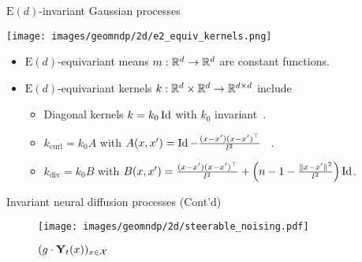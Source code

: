

\begin{frame}{$\mathrm{E}(d)$-invariant Gaussian processes}
    
    \begin{center}
        \texttt{[image: images/geomndp/2d/e2\_equiv\_kernels.png]}
    \end{center}

    \begin{itemize}
    \item $\mathrm{E}(d)$-equivariant means $m: \mathbb{R}^d \rightarrow \mathbb{R}^d$ are constant functions.
    \pause
    \item $\mathrm{E}(d)$-equivariant kernels $k: \mathbb{R}^d \times \mathbb{R}^d \rightarrow \mathbb{R}^{d\times d}$ include
    \begin{itemize} [triangle]
        \item Diagonal kernels $k = k_0 \operatorname{Id}$ with $k_0$ invariant~\cite{holderrieth2021equivariant}.
        \item $k_\mathrm{curl} = k_0 A$ with $A(x, x') = \operatorname{Id} - \frac{(x - x')(x - x')^\top}{l^2}$ ~\cite{macedo2010learning}.
        \item $k_\mathrm{div} = k_0 B$ with $ B(x, x') =\frac{(x - x')(x - x')^\top}{l^2} + \left( n -1 - \frac{\|x - x' \|^2}{l^2} \right) \operatorname{Id}$. %
    \end{itemize}
\end{itemize}

\end{frame}




\begin{frame}{Invariant neural diffusion processes (Cont'd)}
    
    \begin{figure}[t]
    \vspace{-0.5em}
    \centering
        \texttt{[image: images/geomndp/2d/steerable\_noising.pdf]}
        \vspace{-.5em}
        \caption{
            $(g \cdot {\mathbf{Y}}_t(x))_{x \in \mathcal{X}}$
            }
        \label{fig:equiv_noising_model}
    \end{figure}

\end{frame}


